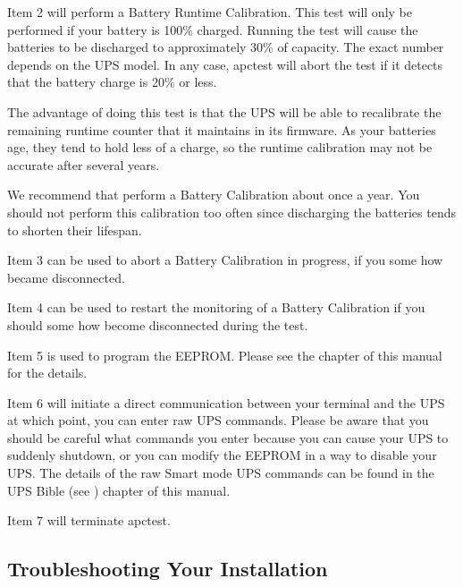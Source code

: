 {{{{Item 2 will perform a Battery Runtime Calibration. This test will only be
performed if your battery is 100\% charged. Running the test will cause the
batteries to be discharged to approximately 30\% of capacity. The exact number
depends on the UPS model. In any case, apctest will abort the test if it
detects that the battery charge is 20\% or less.  

The advantage of doing this test is that the UPS will be able to recalibrate
the remaining runtime counter that it maintains in its firmware. As your
batteries age, they tend to hold less of a charge, so the runtime calibration
may not be accurate after several years.  

We recommend that perform a Battery Calibration about once a year. You should
not perform this calibration too often since discharging the batteries tends
to shorten their lifespan.  

Item 3 can be used to abort a Battery Calibration in progress, if you some how
became disconnected.  

Item 4 can be used to restart the monitoring of a Battery Calibration if you
should some how become disconnected during the test.  

Item 5 is used to program the EEPROM. Please see the 
 chapter
of this manual for the details.  

Item 6 will initiate a direct communication between your terminal and the UPS
at which point, you can enter raw UPS commands. Please be aware that you
should be careful what commands you enter because you can cause your UPS to
suddenly shutdown, or you can modify the EEPROM in a way to disable your UPS.
The details of the raw Smart mode UPS commands can be found in the UPS Bible
(see 
) chapter of this
manual.  

Item 7 will terminate apctest. 

\label{Troubleshooting-Your-Installation}

\subsection*{Troubleshooting Your Installation}

\label{index-Troubleshooting-_0028see-problems_0029-101}
\label{index-Problems-102}

}}}}
